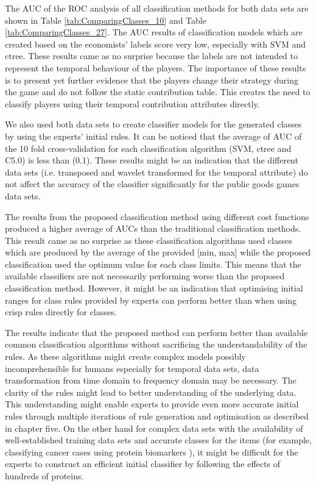 The AUC of the ROC analysis of all classification methods for both data sets are shown in Table \ref{tab:ComparingClasses_10} and Table \ref{tab:ComparingClasses_27}. The AUC results of classification models which are created based on the economists' labels score very low, especially with SVM and ctree. These results came as no surprise because the labels are not intended to represent the temporal behaviour of the players. The importance of these results is to present yet further evidence that the players change their strategy during the game and do not follow the static contribution table. This creates the need to classify players using their temporal contribution attributes directly.

We also used both data sets to create classifier models for the generated classes by using the experts' initial rules. It can be noticed that the average of AUC of the 10 fold cross-validation for each classification algorithm (SVM, ctree and C5.0) is less than (0.1). These results might be an indication that the different data sets (i.e. transposed and wavelet transformed for the temporal attribute) do not affect the accuracy of the classifier significantly for the public goods games data sets. 

The results from the proposed classification method using different cost functions produced a higher average of AUCs than the traditional classification methods. This result came as no surprise as these classification algorithms used classes which are produced by the average of the provided [min, max] while the proposed classification used the optimum value for each class limits. This means that the available classifiers are not necessarily performing worse than the proposed classification method. However, it might be an indication that optimising initial ranges for class rules provided by experts can perform better than when using crisp rules directly for classes. 

The results indicate that the proposed method can perform better than available common classification algorithms without sacrificing the understandability of the rules. As these algorithms might create complex models possibly incomprehensible for humans especially for temporal data sets, data transformation from time domain to frequency domain may be necessary. The clarity of the rules might lead to better understanding of the underlying data. This understanding might enable experts to provide even more accurate initial rules through multiple iterations of rule generation and optimisation as described in chapter five. On the other hand for complex data sets with the availability of well-established training data sets and accurate classes for the items (for example, classifying cancer cases using protein biomarkers  \cite{Liu2013}), it might be difficult for the experts to construct an efficient initial classifier by following the effects of hundreds of proteins.

